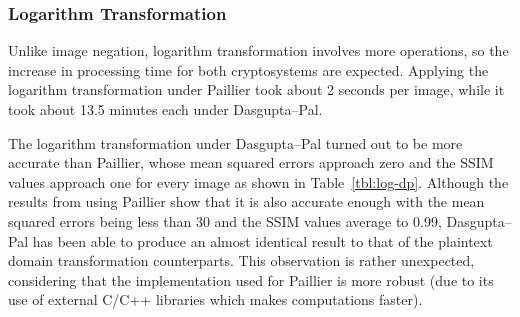 \subsubsection{Logarithm Transformation}
Unlike image negation, logarithm transformation involves more operations, so the increase in processing time for both cryptosystems are expected. Applying the logarithm transformation under Paillier took about 2 seconds per image, while it took about 13.5 minutes each under Dasgupta--Pal.

The logarithm transformation under Dasgupta--Pal turned out to be more accurate than Paillier, whose mean squared errors approach zero and the SSIM values approach one for every image as shown in Table~\ref{tbl:log-dp}. Although the results from using Paillier show that it is also accurate enough with the mean squared errors being less than 30 and the SSIM values average to 0.99, Dasgupta--Pal has been able to produce an almost identical result to that of the plaintext domain transformation counterparts. This observation is rather unexpected, considering that the implementation used for Paillier is more robust (due to its use of external C/C++ libraries which makes computations faster).

